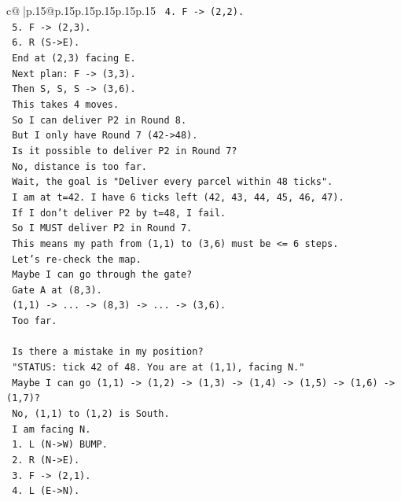 \documentclass{article}
\begin{document}
{\begin{supertabular}{c@{$\;$}|p{.15\linewidth}@{}p{.15\linewidth}p{.15\linewidth}p{.15\linewidth}p{.15\linewidth}p{.15\linewidth}}
{{{\texttt{   4. F {-}> (2,2).} \\
\texttt{   5. F {-}> (2,3).} \\
\texttt{   6. R (S{-}>E).} \\
\texttt{   End at (2,3) facing E.} \\
\texttt{   Next plan: F {-}> (3,3).} \\
\texttt{   Then S, S, S {-}> (3,6).} \\
\texttt{   This takes 4 moves.} \\
\texttt{   So I can deliver P2 in Round 8.} \\
\texttt{   But I only have Round 7 (42{-}>48).} \\
\texttt{   Is it possible to deliver P2 in Round 7?} \\
\texttt{   No, distance is too far.} \\
\texttt{   Wait, the goal is "Deliver every parcel within 48 ticks".} \\
\texttt{   I am at t=42. I have 6 ticks left (42, 43, 44, 45, 46, 47).} \\
\texttt{   If I don't deliver P2 by t=48, I fail.} \\
\texttt{   So I MUST deliver P2 in Round 7.} \\
\texttt{   This means my path from (1,1) to (3,6) must be <= 6 steps.} \\
\texttt{   Let's re{-}check the map.} \\
\texttt{   Maybe I can go through the gate?} \\
\texttt{   Gate A at (8,3).} \\
\texttt{   (1,1) {-}> ... {-}> (8,3) {-}> ... {-}> (3,6).} \\
\texttt{   Too far.} \\
\\ 
\texttt{   Is there a mistake in my position?} \\
\texttt{   "STATUS: tick 42 of 48. You are at (1,1), facing N."} \\
\texttt{   Maybe I can go (1,1) {-}> (1,2) {-}> (1,3) {-}> (1,4) {-}> (1,5) {-}> (1,6) {-}> (1,7)?} \\
\texttt{   No, (1,1) to (1,2) is South.} \\
\texttt{   I am facing N.} \\
\texttt{   1. L (N{-}>W) BUMP.} \\
\texttt{   2. R (N{-}>E).} \\
\texttt{   3. F {-}> (2,1).} \\
\texttt{   4. L (E{-}>N).} \\
}}}
\end{supertabular}}
\end{document}
